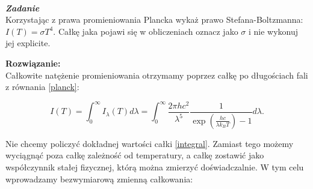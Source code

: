\documentclass[11pt,a4paper]{article}
\newcounter{zadanie}\newcommand{\zadanie}[1][]{\addtocounter{zadanie}{1} ~\\  {\bf \emph{Zadanie \arabic{zadanie} #1 }} \\}
\begin{document}


\newpage

\zadanie
Korzystając z prawa promieniowania Plancka wykaż prawo Stefana-Boltzmanna:  $I(T) = \sigma T^4$.
Całkę jaka pojawi się w obliczeniach oznacz jako $\sigma$ i nie wykonuj jej explicite.


\vskip 10pt
\textbf{Rozwiązanie:}\\
Całkowite natężenie promieniowania otrzymamy poprzez całkę po długościach fali z równania \eqref{planck}:

\begin{equation}
  I(T) = \int_0^\infty I_\lambda(T) d\lambda =
  \int_0^\infty \frac{2 \pi h c^2}{\lambda^5} \frac{1}{\exp\left(\frac{h c}{\lambda k_B T}\right)-1} d\lambda. \label{integral}
\end{equation}

Nie chcemy policzyć dokładnej wartości całki \eqref{integral}. Zamiast tego możemy wyciągnąć poza
całkę zależność od temperatury, a całkę zostawić jako współczynnik stałej fizycznej, którą można
zmierzyć doświadczalnie. W tym celu wprowadzamy bezwymiarową zmienną całkowania:
\end{document}
